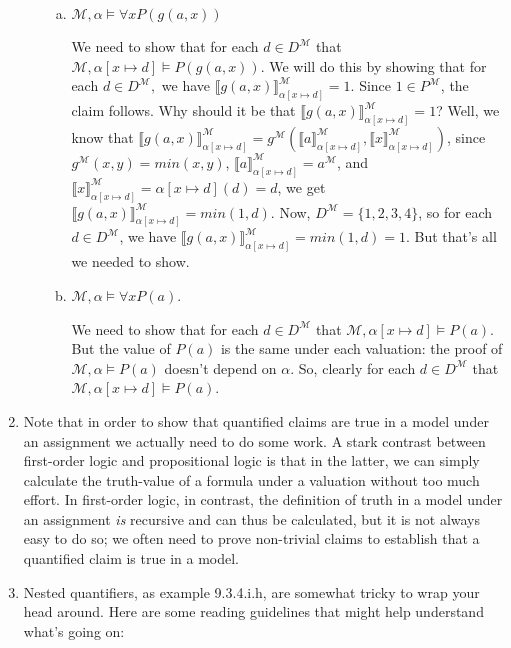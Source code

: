 \begin{enumerate}[\thesection.1]
\begin{enumerate}[(i)]
\begin{enumerate}[(a)]
				\item $\mathcal{M},\alpha\vDash \forall x P(g(a,x))$
				
				We need to show that for each $d\in D^\mathcal{M}$ that $\mathcal{M},\alpha[x\mapsto d]\vDash P(g(a,x))$. We will do this by showing that for each $d\in D^\mathcal{M},$ we have $\llbracket g(a,x)\rrbracket^\mathcal{M}_{\alpha[x\mapsto d]}=1$. Since $1\in P^\mathcal{M}$, the claim follows.  Why should it be that $\llbracket g(a,x)\rrbracket^\mathcal{M}_{\alpha[x\mapsto d]}=1$? Well, we know that $\llbracket g(a,x)\rrbracket^\mathcal{M}_{\alpha[x\mapsto d]}=g^\mathcal{M}(\llbracket a\rrbracket^\mathcal{M}_{\alpha[x\mapsto d]}, \llbracket x\rrbracket^\mathcal{M}_{\alpha[x\mapsto d]})$, since $g^\mathcal{M}(x,y)=min(x,y)$, $\llbracket a\rrbracket^\mathcal{M}_{\alpha[x\mapsto d]}=a^\mathcal{M}$, and $\llbracket x\rrbracket^\mathcal{M}_{\alpha[x\mapsto d]}=\alpha[x\mapsto d](d)=d$, we get $\llbracket g(a,x)\rrbracket^\mathcal{M}_{\alpha[x\mapsto d]}=min(1,d)$. Now, $D^\mathcal{M}=\{1,2,3,4\}$, so for each $d\in D^\mathcal{M}$, we have $\llbracket g(a,x)\rrbracket^\mathcal{M}_{\alpha[x\mapsto d]}=min(1,d)=1$. But that's all we needed to show.
				
				\item $\mathcal{M},\alpha\vDash \forall x P(a)$. 
				
				We need to show that for each $d\in D^\mathcal{M}$ that $\mathcal{M},\alpha[x\mapsto d]\vDash P(a)$. But the value of $P(a)$ is the same under each valuation: the proof of $\mathcal{M},\alpha\vDash P(a)$ doesn't depend on $\alpha$. So, clearly for each $d\in D^\mathcal{M}$ that $\mathcal{M},\alpha[x\mapsto d]\vDash P(a)$.
			
			\end{enumerate}
		
		\end{enumerate}
		
		\item Note that in order to show that quantified claims are true in a model under an assignment we actually need to do some work. A stark contrast between first-order logic and propositional logic is that in the latter, we can simply calculate the truth-value of a formula under a valuation without too much effort. In first-order logic, in contrast, the definition of truth in a model under an assignment \emph{is} recursive and can thus be calculated, but it is not always easy to do so; we often need to prove non-trivial claims to establish that a quantified claim is true in a model. 			
		\item Nested quantifiers, as example 9.3.4.i.h, are somewhat tricky to wrap your head around. Here are some reading guidelines that might help understand what's going on:
		

\end{enumerate}
